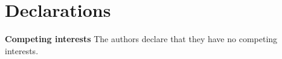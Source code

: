 \documentclass[a4paper]{article}
\numberwithin{equation}{section}
\begin{document}
  \section*{Declarations}
\textbf{Competing interests} The authors declare that they have no competing interests.

 















 










%

\end{document}
